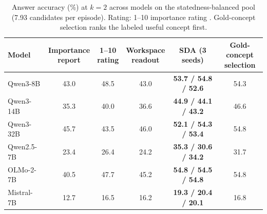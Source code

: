 \begin{table}[t]
\centering
\caption{Answer accuracy (\%) at $k=2$ across models on the statedness-balanced pool (7.93 candidates per episode).
Rating: 1--10 importance rating \citep{park2023generative}. Gold-concept selection ranks the labeled useful concept first.}
\label{tab:balanced}
\small
\setlength{\tabcolsep}{4pt}
\begin{tabular}{lccccc}
\toprule
Model & \shortstack{Importance\\report} & \shortstack{1--10\\rating} & \shortstack{Workspace\\readout} & \textbf{SDA (3 seeds)} & \shortstack{Gold-concept\\selection} \\
\midrule
Qwen3-8B & 43.0 & 48.5 & 43.0 & \textbf{53.7 / 54.8 / 52.6} & 54.3 \\
Qwen3-14B & 35.3 & 40.0 & 36.6 & \textbf{44.9 / 44.1 / 43.2} & 46.6 \\
Qwen3-32B & 45.7 & 43.5 & 46.0 & \textbf{52.1 / 54.3 / 53.4} & 54.8 \\
Qwen2.5-7B & 23.4 & 26.4 & 24.2 & \textbf{35.3 / 30.6 / 34.2} & 31.7 \\
OLMo-2-7B & 40.5 & 47.7 & 45.2 & \textbf{54.8 / 54.5 / 54.8} & 54.8 \\
Mistral-7B & 12.7 & 16.5 & 16.2 & \textbf{19.3 / 20.4 / 20.1} & 16.8 \\
\bottomrule
\end{tabular}
\end{table}
